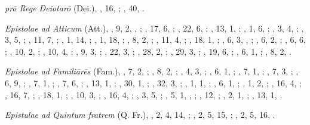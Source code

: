 \begin{autindex}
  \subitem \emph{prō Rege Deiotarō} (Dei.),
    , 16, ;
    , 40, .

  \subitem \emph{Epistolae ad Atticum} (Att.),
    ,  9,  2, , ;
    , 17,  6, ;
    , 22,  6, ;
    , 13,  1, ;
    ,  1,  6, ;
    ,  3,  4, ;
    ,  3,  5, ;
    , 11,  7, ;
    ,  1, 14, ;
    ,  1, 18, ;
    ,  8,  2, ;
    , 11,  4, ;
    , 18,  1, ;
    ,  6,  3, , ;
    ,  6,  2, ;
    ,  6,  6, ;
    , 10,  2, ;
    , 10,  4, ;
    ,  9,  3, ;
    , 22,  3, ;
    , 28,  2, ;
    , 29,  3, ;
    , 19,  6, ;
    ,  6,  1, ;
    ,  8,  2, .

  \subitem \emph{Epistolae ad Familiārēs} (Fam.),
    ,  7, 2, ;
    ,  8, 2, ;
    ,  4, 3, ;
    ,  6, 1, ;
    ,  7, 1, ;
    ,  7, 3, ;
    ,  6, 9, ;
    ,  7, 1, ;
    ,  7, 6, ;
    , 13, 1, ;
    , 30, 1, ;
    , 32, 3, ;
    ,  1, 1, ;
    ,  6, 1, ;
    ,  1, 2, ;
    , 16, 4, ;
    , 16, 7, ;
    , 18, 1, ;
    , 10, 3, ;
    , 16, 4, ;
    ,  3, 5, ;
    ,  5, 1, , ;
    , 12,    ;
    ,  2, 1, ;
    , 13, 1, .

  \subitem \emph{Epistulae ad Quintum fratrem} (Q. Fr.),
    , 2, 4, 14, ;
    , 2, 5, 15, ;
    , 2, 5, 16, .


\end{autindex}
